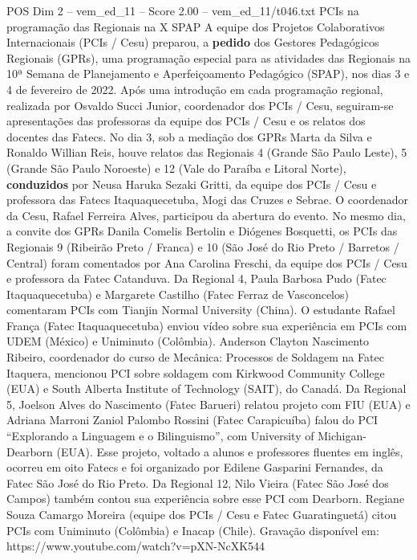 \begin{textsample}{POS Dim 2 – vem\_ed\_11 – Score 2.00 – vem\_ed\_11/t046.txt}  \label{ex:f2_pos_156}
PCIs na programação das Regionais na X SPAP A equipe dos Projetos Colaborativos Internacionais (PCIs / Cesu) preparou, a \textbf{pedido} dos Gestores Pedagógicos Regionais (GPRs), uma programação especial para as atividades das Regionais na 10ª Semana de Planejamento e Aperfeiçoamento Pedagógico (SPAP), nos dias 3 e 4 de fevereiro de 2022.
Após uma introdução em cada programação regional, realizada por Osvaldo Succi Junior, coordenador dos PCIs / Cesu, seguiram-se apresentações das professoras da equipe dos PCIs / Cesu e os relatos dos docentes das Fatecs.
No dia 3, sob a mediação dos GPRs Marta da Silva e Ronaldo Willian Reis, houve relatos das Regionais 4 (Grande São Paulo Leste), 5 (Grande São Paulo Noroeste) e 12 (Vale do Paraíba e Litoral Norte), \textbf{conduzidos} por Neusa Haruka Sezaki Gritti, da equipe dos PCIs / Cesu e professora das Fatecs Itaquaquecetuba, Mogi das Cruzes e Sebrae.
O coordenador da Cesu, Rafael Ferreira Alves, participou da abertura do evento.
No mesmo dia, a convite dos GPRs Danila Comelis Bertolin e Diógenes Bosquetti, os PCIs das Regionais 9 (Ribeirão Preto / Franca) e 10 (São José do Rio Preto / Barretos / Central) foram comentados por Ana Carolina Freschi, da equipe dos PCIs / Cesu e professora da Fatec Catanduva.
Da Regional 4, Paula Barbosa Pudo (Fatec Itaquaquecetuba) e Margarete Castilho (Fatec Ferraz de Vasconcelos) comentaram PCIs com Tianjin Normal University (China).
O estudante Rafael França (Fatec Itaquaquecetuba) enviou vídeo sobre sua experiência em PCIs com UDEM (México) e Uniminuto (Colômbia).
Anderson Clayton Nascimento Ribeiro, coordenador do curso de Mecânica: Processos de Soldagem na Fatec Itaquera, mencionou PCI sobre soldagem com Kirkwood Community College (EUA) e South Alberta Institute of Technology (SAIT), do Canadá.
Da Regional 5, Joelson Alves do Nascimento (Fatec Barueri) relatou projeto com FIU (EUA) e Adriana Marroni Zaniol Palombo Rossini (Fatec Carapicuíba) falou do PCI “Explorando a Linguagem e o Bilinguismo”, com University of Michigan-Dearborn (EUA).
Esse projeto, voltado a alunos e professores fluentes em inglês, ocorreu em oito Fatecs e foi organizado por Edilene Gasparini Fernandes, da Fatec São José do Rio Preto.
Da Regional 12, Nilo Vieira (Fatec São José dos Campos) também contou sua experiência sobre esse PCI com Dearborn.
Regiane Souza Camargo Moreira (equipe dos PCIs / Cesu e Fatec Guaratinguetá) citou PCIs com Uniminuto (Colômbia) e Inacap (Chile).
Gravação disponível em: https://www.youtube.com/watch?v=pXN-NcXK544

\end{textsample}
